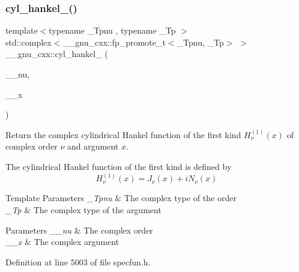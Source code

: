 \subsubsection{\texorpdfstring{cyl\+\_\+hankel\+\_()}{cyl\_hankel\_1()}\hspace{0.1cm}{\footnotesize\ttfamily [2/2]}}
{\footnotesize\ttfamily template$<$typename \+\_\+\+Tpnu , typename \+\_\+\+Tp $>$ \\
std\+::complex$<$\+\_\+\+\_\+gnu\+\_\+cxx\+::fp\+\_\+promote\+\_\+t$<$\+\_\+\+Tpnu, \+\_\+\+Tp$>$ $>$ \+\_\+\+\_\+gnu\+\_\+cxx\+::cyl\+\_\+hankel\+\_ (\begin{DoxyParamCaption}\item[{std\+::complex$<$ \+\_\+\+Tpnu $>$}]{\+\_\+\+\_\+nu,  }\item[{std\+::complex$<$ \+\_\+\+Tp $>$}]{\+\_\+\+\_\+x }\end{DoxyParamCaption})\hspace{0.3cm}{\ttfamily [inline]}}

Return the complex cylindrical Hankel function of the first kind $ H^{(1)}_\nu(x) $ of complex order $ \nu $ and argument $ x $.

The cylindrical Hankel function of the first kind is defined by \[ H^{(1)}_\nu(x) = J_\nu(x) + i N_\nu(x) \]


\begin{DoxyTemplParams}{Template Parameters}
{\em \+\_\+\+Tpnu} & The complex type of the order \\
\hline
{\em \+\_\+\+Tp} & The complex type of the argument \\
\hline
\end{DoxyTemplParams}

\begin{DoxyParams}{Parameters}
{\em \+\_\+\+\_\+nu} & The complex order \\
\hline
{\em \+\_\+\+\_\+x} & The complex argument \\
\hline
\end{DoxyParams}


Definition at line 5003 of file specfun.\+h.

\mbox{\label{group__gnu__math__spec__func_ga89758ed03e56567baa62b90cc4784f71}} 
